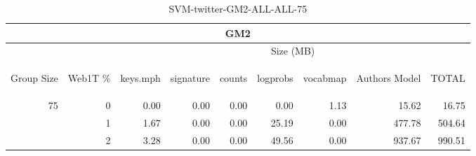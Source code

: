 \begin{center}
\begin{table}[htbp] 
 \begin{center}
\begin{tabular}{ | r | r | r | r | r | r | r | r | r |}
\hline
\multicolumn{9}{|c|}{GM2}\\
\hline
 & & \multicolumn{7}{|c|}{Size (MB)}\\ \cline{3-9}
\begin{sideways}Group Size\end{sideways} & \begin{sideways}Web1T \% \end{sideways} & \begin{sideways}keys.mph\end{sideways} & \begin{sideways}signature\end{sideways} & \begin{sideways}counts\end{sideways} & \begin{sideways}logprobs\end{sideways} & \begin{sideways}vocabmap\end{sideways} & \begin{sideways}Authors Model \end{sideways} & \begin{sideways}TOTAL\end{sideways}\\
\hline
\multirow{2}{*}{75}
 & 0 & 0.00 & 0.00 & 0.00 & 0.00 & 1.13 & 15.62 & 16.75\\ \cline{2-9}
 & 1 & 1.67 & 0.00 & 0.00 & 25.19 & 0.00 & 477.78 & 504.64\\ \cline{2-9}
 & 2 & 3.28 & 0.00 & 0.00 & 49.56 & 0.00 & 937.67 & 990.51\\ \cline{2-9}
\hline
\end{tabular}
\caption{SVM-twitter-GM2-ALL-ALL-75}
\label{table:SVM-twitter-GM2-ALL-ALL-75}
\end{center}
 \end{table}
\end{center}

